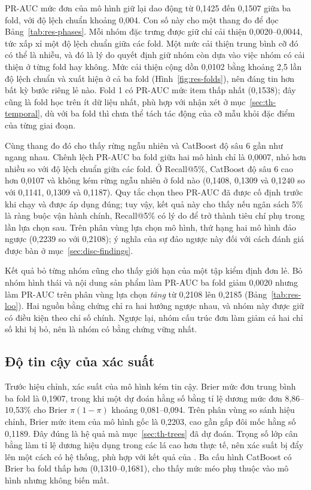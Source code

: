 PR-AUC mức đơn của mô hình giữ lại dao động từ 0,1425 đến 0,1507 giữa ba fold, với độ lệch chuẩn khoảng 0,004. Con số này cho một thang đo để đọc Bảng~\ref{tab:res-phases}. Mỗi nhóm đặc trưng được giữ chỉ cải thiện 0,0020--0,0044, tức xấp xỉ một độ lệch chuẩn giữa các fold. Một mức cải thiện trung bình cỡ đó có thể là nhiễu, và đó là lý do quyết định giữ nhóm còn dựa vào việc nhóm có cải thiện ở từng fold hay không. Mức cải thiện cộng dồn 0,0102 bằng khoảng 2,5 lần độ lệch chuẩn và xuất hiện ở cả ba fold (Hình~\ref{fig:res-folds}), nên đáng tin hơn bất kỳ bước riêng lẻ nào. Fold 1 có PR-AUC mức item thấp nhất (0,1538); đây cũng là fold học trên ít dữ liệu nhất, phù hợp với nhận xét ở mục~\ref{sec:th-temporal}, dù với ba fold thì chưa thể tách tác động của cỡ mẫu khỏi đặc điểm của từng giai đoạn.

Cùng thang đo đó cho thấy rừng ngẫu nhiên và CatBoost độ sâu 6 gần như ngang nhau. Chênh lệch PR-AUC ba fold giữa hai mô hình chỉ là 0,0007, nhỏ hơn nhiều so với độ lệch chuẩn giữa các fold. Ở Recall@5\%, CatBoost độ sâu 6 cao hơn 0,0107 và không kém rừng ngẫu nhiên ở fold nào (0,1408, 0,1309 và 0,1240 so với 0,1141, 0,1309 và 0,1187). Quy tắc chọn theo PR-AUC đã được cố định trước khi chạy và được áp dụng đúng; tuy vậy, kết quả này cho thấy nếu ngân sách 5\% là ràng buộc vận hành chính, Recall@5\% có lý do để trở thành tiêu chí phụ trong lần lựa chọn sau. Trên phân vùng lựa chọn mô hình, thứ hạng hai mô hình đảo ngược (0,2239 so với 0,2108); ý nghĩa của sự đảo ngược này đối với cách đánh giá được bàn ở mục~\ref{sec:disc-findings}.

Kết quả bỏ từng nhóm cũng cho thấy giới hạn của một tập kiểm định đơn lẻ. Bỏ nhóm hình thái và nội dung sản phẩm làm PR-AUC ba fold giảm 0,0020 nhưng làm PR-AUC trên phân vùng lựa chọn \emph{tăng} từ 0,2108 lên 0,2185 (Bảng~\ref{tab:res-loo}). Hai nguồn bằng chứng chỉ ra hai hướng ngược nhau, và nhóm này được giữ có điều kiện theo chỉ số chính. Ngược lại, nhóm cấu trúc đơn làm giảm cả hai chỉ số khi bị bỏ, nên là nhóm có bằng chứng vững nhất.

\subsection{Độ tin cậy của xác suất}\label{sec:analysis-calibration}

Trước hiệu chỉnh, xác suất của mô hình kém tin cậy. Brier mức đơn trung bình ba fold là 0,1907, trong khi một dự đoán hằng số bằng tỉ lệ dương mức đơn 8,86--10,53\% cho Brier $\pi(1-\pi)$ khoảng 0,081--0,094. Trên phân vùng so sánh hiệu chỉnh, Brier mức item của mô hình gốc là 0,2203, cao gần gấp đôi mốc hằng số 0,1189. Đây đúng là hệ quả mà mục~\ref{sec:th-trees} đã dự đoán. Trọng số lớp cân bằng làm tỉ lệ dương hiệu dụng trong các lá cao hơn thực tế, nên xác suất bị đẩy lên một cách có hệ thống, phù hợp với kết quả của \textcite{vandengoorbergh2022}. Ba cấu hình CatBoost có Brier ba fold thấp hơn (0,1310--0,1681), cho thấy mức méo phụ thuộc vào mô hình nhưng không biến mất.

